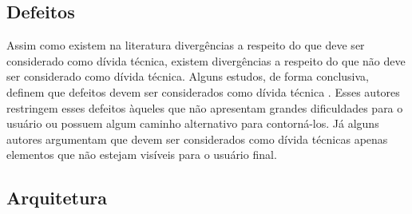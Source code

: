 \subsection{Defeitos}

Assim como existem na literatura divergências a respeito do que deve ser considerado como dívida técnica, existem divergências a respeito do que não deve ser considerado como dívida técnica. Alguns estudos, de forma conclusiva, definem que defeitos devem ser considerados como dívida técnica \cite{davis2013driving,guo2011portfolio,xuan2012debt}. Esses autores restringem esses defeitos àqueles que não apresentam grandes dificuldades para o usuário ou possuem algum caminho alternativo para contorná-los. Já alguns autores argumentam que devem ser considerados como dívida técnicas apenas elementos que não estejam visíveis para o usuário final\cite{kruchten2013technical}. 

\subsection{Arquitetura}
\label{tipo_td_arquitetura}

